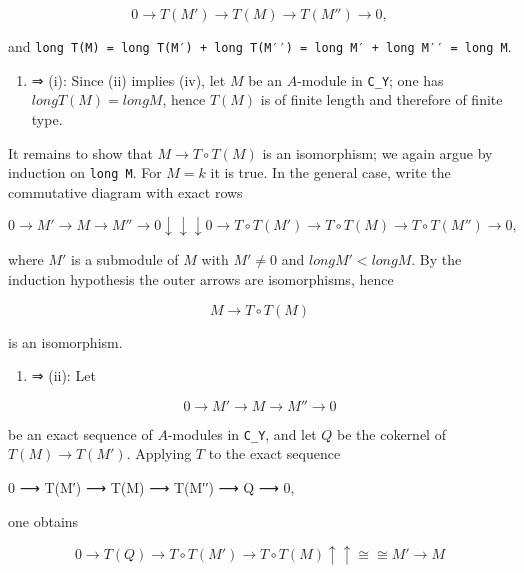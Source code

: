 \documentclass[
  11pt,
  a4paper,
]{book}
\newenvironment{Shaded}{}{}
\newcommand{\NormalTok}[1]{#1}
\providecommand{\tightlist}{%
  \setlength{\itemsep}{0pt}\setlength{\parskip}{0pt}}
\begin{document}
\[ 0 \longrightarrow T(M') \longrightarrow T(M) \longrightarrow T(M'') \longrightarrow 0, \]

and
\texttt{long\ T(M)\ =\ long\ T(M′)\ +\ long\ T(M′′)\ =\ long\ M′\ +\ long\ M′′\ =\ long\ M}.

\begin{enumerate}
\def\labelenumi{(\roman{enumi})}
\setcounter{enumi}{1}
\tightlist
\item
  ⇒ (i): Since (ii) implies (iv), let \(M\) be an \(A\)-module in
  \texttt{C\_Y}; one has \(long T(M) = long M\), hence \(T(M)\) is of
  finite length and therefore of finite type.
\end{enumerate}

It remains to show that \(M \to T \circ T(M)\) is an isomorphism; we
again argue by induction on \texttt{long\ M}. For \(M = k\) it is true.
In the general case, write the commutative diagram with exact rows

\[ 0 \longrightarrow M' \longrightarrow M \longrightarrow M'' \longrightarrow 0 \downarrow \downarrow \downarrow 0
\longrightarrow T\circ T(M') \longrightarrow T\circ T(M) \longrightarrow T\circ T(M'') \longrightarrow 0, \]

where \(M'\) is a submodule of \(M\) with \(M' \neq 0\) and
\(long M' < long M\). By the induction hypothesis the outer arrows are
isomorphisms, hence

\[ M \longrightarrow T \circ T(M) \]

is an isomorphism.

\begin{enumerate}
\def\labelenumi{(\roman{enumi})}
\tightlist
\item
  ⇒ (ii): Let
\end{enumerate}

\[ 0 \longrightarrow M' \longrightarrow M \longrightarrow M'' \longrightarrow 0 \]

be an exact sequence of \(A\)-modules in \texttt{C\_Y}, and let \(Q\) be
the cokernel of \(T(M) \to T(M')\). Applying \(T\) to the exact sequence

\begin{Shaded}
\begin{Highlighting}[]
\NormalTok{0 ⟶ T(M′) ⟶ T(M) ⟶ T(M′′) ⟶ Q ⟶ 0,}
\end{Highlighting}
\end{Shaded}

one obtains

\[ 0 \longrightarrow T(Q) \longrightarrow T\circ T(M') \longrightarrow T\circ T(M) \uparrow \uparrow \cong \cong M'
\longrightarrow M \]
\end{document}
